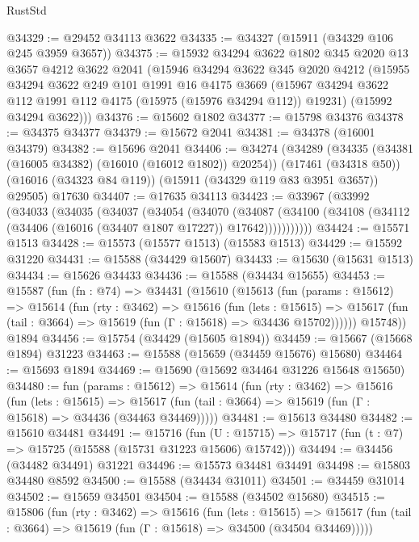 \begin{lexlean}{RustStd}
\begin{coremodule}
@34329 := @29452 @34113 @3622
@34335 := @34327 (@15911 (@34329 @106 @245 @3959 @3657))
@34375 := @15932
    @34294
    @3622
    @1802
    @345
    @2020
    @13
    @3657
    @4212
    @3622
    @2041
    (@15946
      @34294
      @3622
      @345
      @2020
      @4212
      (@15955
        @34294
        @3622
        @249
        @101
        @1991
        @16
        @4175
        @3669
        (@15967 @34294 @3622 @112 @1991 @112 @4175 (@15975 (@15976 @34294 @112)) @19231)
        (@15992 @34294 @3622)))
@34376 := @15602 @1802
@34377 := @15798 @34376
@34378 := @34375 @34377
@34379 := @15672 @2041
@34381 := @34378 (@16001 @34379)
@34382 := @15696 @2041
@34406 := @34274
    (@34289
      (@34335 (@34381 (@16005 @34382) (@16010 (@16012 @1802)) @20254))
      (@17461 (@34318 @50))
      (@16016 (@34323 @84 @119))
      (@15911 (@34329 @119 @83 @3951 @3657))
      @29505)
    @17630
@34407 := @17635 @34113
@34423 := @33967
    (@33992
      (@34033
        (@34035
          (@34037
            (@34054
              (@34070
                (@34087
                  (@34100 (@34108 (@34112 (@34406 (@16016 (@34407 @1807 @17227)) @17642)))))))))))
@34424 := @15571 @1513
@34428 := @15573 (@15577 @1513) (@15583 @1513)
@34429 := @15592 @31220
@34431 := @15588 (@34429 @15607)
@34433 := @15630 (@15631 @1513)
@34434 := @15626 @34433
@34436 := @15588 (@34434 @15655)
@34453 := @15587
    (fun (fn : @74) =>
    @34431
      (@15610
        (@15613
          (fun (params : @15612) =>
          @15614
            (fun (rty : @3462) =>
            @15616
              (fun (lets : @15615) =>
              @15617 (fun (tail : @3664) => @15619 (fun (Γ : @15618) => @34436 @15702))))))
        @15748))
    @1894
@34456 := @15754 (@34429 (@15605 @1894))
@34459 := @15667 (@15668 @1894) @31223
@34463 := @15588 (@15659 (@34459 @15676) @15680)
@34464 := @15693 @1894
@34469 := @15690 (@15692 @34464 @31226 @15648 @15650)
@34480 := fun (params : @15612) =>
  @15614
    (fun (rty : @3462) =>
    @15616
      (fun (lets : @15615) =>
      @15617 (fun (tail : @3664) => @15619 (fun (Γ : @15618) => @34436 (@34463 @34469)))))
@34481 := @15613 @34480
@34482 := @15610 @34481
@34491 := @15716
    (fun (U : @15715) => @15717 (fun (t : @7) => @15725 (@15588 (@15731 @31223 @15606) @15742)))
@34494 := @34456 (@34482 @34491) @31221
@34496 := @15573 @34481 @34491
@34498 := @15803 @34480 @8592
@34500 := @15588 (@34434 @31011)
@34501 := @34459 @31014
@34502 := @15659 @34501
@34504 := @15588 (@34502 @15680)
@34515 := @15806
    (fun (rty : @3462) =>
    @15616
      (fun (lets : @15615) =>
      @15617 (fun (tail : @3664) => @15619 (fun (Γ : @15618) => @34500 (@34504 @34469)))))

\end{coremodule}
\end{lexlean}
